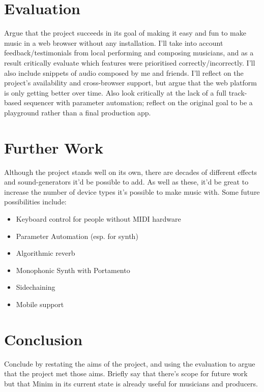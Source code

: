 \documentclass[11pt, a4paper]{article}
\begin{document}
\section{Evaluation}
Argue that the project succeeds in its goal of making it easy and fun to make music in a web browser without any installation. I'll take into account feedback/testimonials from local performing and composing musicians, and as a result critically evaluate which features were prioritised correctly/incorrectly. I'll also include snippets of audio composed by me and friends. I'll reflect on the project's availability and cross-browser support, but argue that the web platform is only getting better over time. Also look critically at the lack of a full track-based sequencer with parameter automation; reflect on the original goal to be a playground rather than a final production app.
\pagebreak

\section{Further Work}
Although the project stands well on its own, there are decades of different effects and sound-generators it'd be possible to add. As well as these, it'd be great to increase the number of device types it's possible to make music with. Some future possibilities include:
\begin{itemize}
	\item Keyboard control for people without MIDI hardware
	\item Parameter Automation (esp. for synth)
	\item Algorithmic reverb
	\item Monophonic Synth with Portamento
	\item Sidechaining
	\item Mobile support
\end{itemize}

\pagebreak

\section{Conclusion}
Conclude by restating the aims of the project, and using the evaluation to argue that the project met those aims. Briefly say that there's scope for future work but that Minim in its current state is already useful for musicians and producers. 
\end{document}
